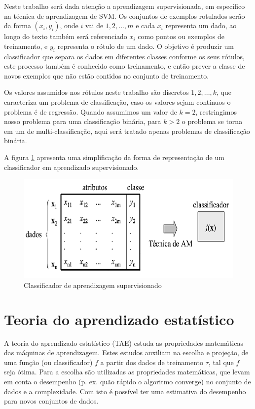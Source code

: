 Neste trabalho será dada atenção a aprendizagem supervisionada, em específico na técnica de aprendizagem de SVM. Os conjuntos de exemplos rotulados serão da forma $(x_{i},y_{i})$, onde $i$ vai de $1,2,...,m$ e cada $x_{i}$ representa um dado, ao longo do texto também será referenciado $x_{i}$ como pontos ou exemplos de treinamento, e $y_{i}$ representa o rótulo de um dado. O objetivo é produzir um classificador que separa os dados em diferentes classes conforme os seus rótulos, este processo também é conhecido como treinamento, e então prever a classe de novos exemplos que não estão contidos no conjunto de treinamento.

Os valores assumidos nos rótulos neste trabalho são discretos $1,2,...,k$, que caracteriza um problema de classificação, caso os valores sejam contínuos o problema é de regressão. Quando assumimos um valor de $k=2$, restringimos nosso problema para uma classificação binária, para $k > 2$ o problema se torna em um de multi-classificação, aqui será tratado apenas problemas de classificação binária.

A figura \ref{fig:classificador_supervisionado} apresenta uma simplificação da forma de representação de um classificador em aprendizado supervisionado.

\begin{figure}[htb]
	\centering
	\includegraphics[scale=0.5]{./figuras/classificador_supervisionado.png}
	\caption{Classificador de aprendizagem supervisionado \cite{Lorena2007}}
	\label{fig:classificador_supervisionado}
\end{figure}


\section{Teoria do aprendizado estatístico}\label{S3}

A teoria do aprendizado estatístico (TAE) estuda as propriedades matemáticas das máquinas de aprendizagem. Estes estudos auxiliam na escolha e projeção, de uma função (ou classificador) $f$ a partir dos dados de treinamento $\tau$, tal que $f$ seja ótima. Para a escolha são utilizadas as propriedades matemáticas, que levam em conta o desempenho (p. ex. quão rápido o algoritmo converge) no conjunto de dados e a complexidade. Com isto é possível ter uma estimativa do desempenho para novos conjuntos de dados.


